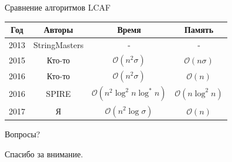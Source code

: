 \documentclass[hyperref=unicode,graphics=pdflatex,12pt]{beamer}
\begin{document}
\begin{frame}{Сравнение алгоритмов LCAF}
\begin{tabular}{|c|c|c|c|}
\hline
Год & Авторы & Время & Память \\
\hline
2013 & StringMasters & - & - \\
\hline
2015 & Кто-то & $\mathcal{O}(n^2 \sigma)$ & $\mathcal{O}(n \sigma)$ \\
\hline
2016 & Кто-то & $\mathcal{O}(n^2 \sigma)$ & $\mathcal{O}(n)$ \\
\hline
2016 & SPIRE & $\mathcal{O}(n^2 \log^2 n \log^* n)$ & $\mathcal{O}(n \log^2 n)$ \\
\hline
2017 & Я & $\mathcal{O}(n^2 \log \sigma)$ & $\mathcal{O}(n)$ \\
\hline
\end{tabular}
\end{frame}

\begin{frame}{Вопросы?}
\begin{center}
Спасибо за внимание.
\end{center}
\end{frame}
\end{document}
